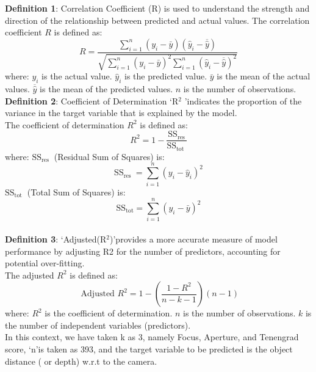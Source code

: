 \documentclass[sn-mathphys]{sn-jnl}%
\theoremstyle{thmstyleone}%
\theoremstyle{thmstyletwo}%
\theoremstyle{thmstylethree}%
\begin{document}
\textbf{Definition 1}: Correlation Coefficient (R)  is used to understand the strength and direction of the relationship between predicted and actual values.
The correlation coefficient $R$ is defined as:
$$
R=\frac{\sum_{i=1}^n\left(y_i-\bar{y}\right)\left(\hat{y}_i-\overline{\hat{y}}\right)}{\sqrt{\sum_{i=1}^n\left(y_i-\bar{y}\right)^2 \sum_{i=1}^n\left(\hat{y}_i-\overline{\hat{y}}\right)^2}}
$$
where:
$y_i$ is the actual value.
$\hat{y}_i$ is the predicted value.
$\bar{y}$ is the mean of the actual values.
$\overline{\hat{y}}$ is the mean of the predicted values.
$n$ is the number of observations.\\


\textbf{Definition 2}: Coefficient of Determination \lq R$^{2}$ \rq indicates the proportion of the variance in the target variable that is explained by the model.\\
The coefficient of determination $R^2$ is defined as:
$$
R^2=1-\frac{\mathrm{SS}_{\mathrm{res}}}{\mathrm{SS}_{\text {tot }}}
$$
where:
$\mathrm{SS}_{\text {res }}$ (Residual Sum of Squares) is:
$$
\mathrm{SS}_{\text {res }}=\sum_{i=1}^n\left(y_i-\hat{y}_i\right)^2
$$
$\mathrm{SS}_{\text {tot }}$ (Total Sum of Squares) is:
$$
\mathrm{SS}_{\mathrm{tot}}=\sum_{i=1}^n\left(y_i-\bar{y}\right)^2
$$\\



\textbf{Definition 3}: \lq Adjusted(R$^{2}$)\rq provides a more accurate measure of model performance by adjusting R2 for the number of predictors, accounting for potential over-fitting.\\
The adjusted $R^2$ is defined as:
$$
\text { Adjusted } R^2=1-\left(\frac{1-R^2}{n-k-1}\right)(n-1)
$$
where:
$R^2$ is the coefficient of determination.
$n$ is the number of observations.
$k$ is the number of independent variables (predictors).\\


In this context, we have taken k as 3, namely Focus, Aperture, and Tenengrad score, \lq n\rq \space is taken as 393, and the target variable to be predicted is the object distance ( or depth) w.r.t to the camera.\\
\end{document}
